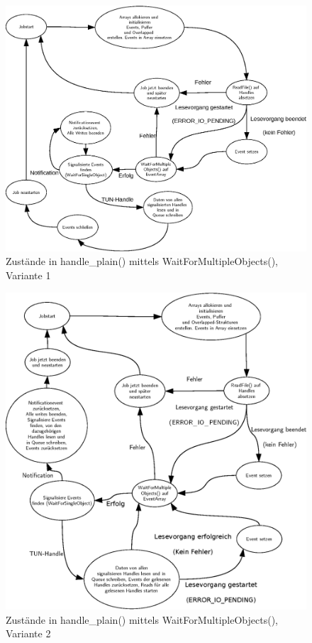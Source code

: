 {\begin{figure}
\centering
\def\svgwidth{\columnwidth}
\includegraphics[width=\textwidth]{WaitForMultipleObjects.eps}
\caption{Zustände in handle\_plain() mittels WaitForMultipleObjects(), Variante 1}
\label{fig:WaitForMultipleObjects}
\end{figure}

\begin{figure}
\centering
\def\svgwidth{\columnwidth}
\includegraphics[width=\textwidth]{WaitForMultipleObjects2.eps}
\caption{Zustände in handle\_plain() mittels WaitForMultipleObjects(), Variante 2}
\label{fig:WaitForMultipleObjects2}
\end{figure}

}
